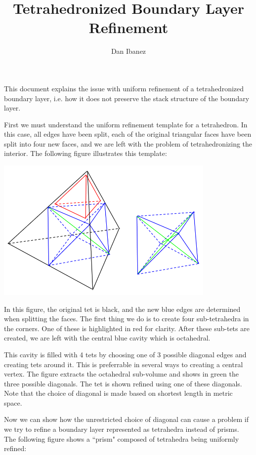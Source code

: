 \documentclass{article}
\title{Tetrahedronized Boundary Layer Refinement}
\author{Dan Ibanez}
\begin{document}
\maketitle

This document explains the issue with uniform refinement
of a tetrahedronized boundary layer, i.e. how it does not
preserve the stack structure of the boundary layer.

First we must understand the uniform refinement template
for a tetrahedron. In this case, all edges have been split,
each of the original triangular faces have been split into four
new faces, and we are left with the problem of tetrahedronizing
the interior. The following figure illustrates this template:

\includegraphics[width=0.8\textwidth]{tet_uniform_refine.png}

In this figure, the original tet is black, and the new blue edges are
determined when splitting the faces.
The first thing we do is to create four sub-tetrahedra in the corners.
One of these is highlighted in red for clarity.
After these sub-tets are created, we are left with the central blue cavity
which is octahedral.

This cavity is filled with 4 tets by choosing one of 3 possible diagonal
edges and creating tets around it.
This is preferrable in several ways to creating a central vertex.
The figure extracts the octahedral sub-volume and shows in green the three
possible diagonals.
The tet is shown refined using one of these diagonals.
Note that the choice of diagonal is made based on shortest length in metric
space.

Now we can show how the unrestricted choice of diagonal can cause a problem
if we try to refine a boundary layer represented as tetrahedra instead of
prisms.
The following figure shows a ``prism" composed of tetrahedra being uniformly
refined:
\end{document}
